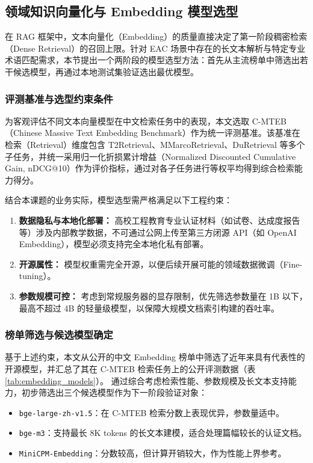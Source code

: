 \documentclass[UTF8,a4paper,zihao=-4]{ctexart}
\begin{document}
\subsection{领域知识向量化与 Embedding 模型选型}

在 RAG 框架中，文本向量化（Embedding）的质量直接决定了第一阶段稠密检索（Dense Retrieval）的召回上限。针对 EAC 场景中存在的长文本解析与特定专业术语匹配需求，本节提出一个两阶段的模型选型方法：首先从主流榜单中筛选出若干候选模型，再通过本地测试集验证选出最优模型。

\subsubsection{评测基准与选型约束条件}

为客观评估不同文本向量模型在中文检索任务中的表现，本文选取 C-MTEB（Chinese Massive Text Embedding Benchmark）作为统一评测基准。该基准在检索（Retrieval）维度包含 T2Retrieval、MMarcoRetrieval、DuRetrieval 等多个子任务，并统一采用归一化折损累计增益（Normalized Discounted Cumulative Gain, nDCG@10）作为评价指标，通过对各子任务进行等权平均得到综合检索能力得分\cite{c-mteb}。

结合本课题的业务实际，模型选型需严格满足以下工程约束：
\begin{enumerate}
    \item \textbf{数据隐私与本地化部署：} 高校工程教育专业认证材料（如试卷、达成度报告等）涉及内部教学数据，不可通过公网上传至第三方闭源 API（如 OpenAI Embedding），模型必须支持完全本地化私有部署。
    \item \textbf{开源属性：} 模型权重需完全开源，以便后续开展可能的领域数据微调（Fine-tuning）。
    \item \textbf{参数规模可控：} 考虑到常规服务器的显存限制，优先筛选参数量在 1B 以下，最高不超过 4B 的轻量级模型，以保障大规模文档索引构建的吞吐率。
\end{enumerate}

\subsubsection{榜单筛选与候选模型确定}

基于上述约束，本文从公开的中文 Embedding 榜单中筛选了近年来具有代表性的开源模型，并汇总了其在 C-MTEB 检索任务上的公开评测数据（表 \ref{tab:embedding_models}）。  
通过综合考虑检索性能、参数规模及长文本支持能力，初步筛选出三个候选模型作为下一阶段验证对象：
\begin{itemize}
    \item \texttt{bge-large-zh-v1.5}：在 C-MTEB 检索分数上表现优异，参数量适中。  
    \item \texttt{bge-m3}：支持最长 8K tokens 的长文本建模，适合处理篇幅较长的认证文档。  
    \item \texttt{MiniCPM-Embedding}：分数较高，但计算开销较大，作为性能上界参考。
\end{itemize}
\end{document}
